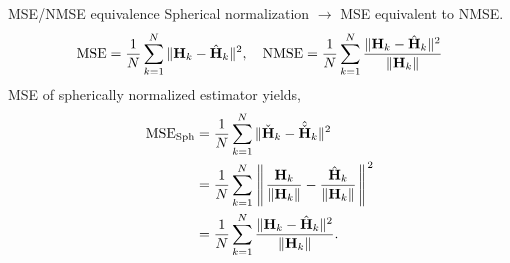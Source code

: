 \documentclass{beamer}
\renewcommand{\vec}[1]{\mathbf{#1}}
\begin{document}
  \begin{frame}{MSE/NMSE equivalence}
    \footnotesize{
    Spherical normalization $\to$ MSE equivalent to NMSE.
    \begin{align*}
      \text{MSE}=\frac 1N \sum_{k=1}^N\Arrowvert\mathbf H_k - \hat{\mathbf H}_k\Arrowvert^2,\quad \text{NMSE} =\frac 1N \sum_{k=1}^N\frac{\Arrowvert\mathbf H_k - \hat{\mathbf H}_k\Arrowvert^2}{\Arrowvert\mathbf H_k\Arrowvert} \\        
    \end{align*}
    \pause
    MSE of spherically normalized estimator yields,
    \begin{align*}
      \text{MSE}_{\text{Sph}} &= \frac 1N \sum_{k=1}^N\Arrowvert\check{\mathbf H}_k - \hat{\check{\mathbf H}}_k\Arrowvert^2 \\
      &= \frac 1N \sum_{k=1}^N\left\Arrowvert \frac{\mathbf H_k}{\Arrowvert\mathbf H_k\Arrowvert} - \frac{\hat{\mathbf H}_k}{\Arrowvert\mathbf H_k\Arrowvert}\right\Arrowvert^2 \\
      &= \frac 1N \sum_{k=1}^N\frac{\Arrowvert\mathbf H_k - \hat{\mathbf H}_k\Arrowvert^2}{\Arrowvert\mathbf H_k\Arrowvert}.
    \end{align*}
    }
\end{frame}


\end{document}
